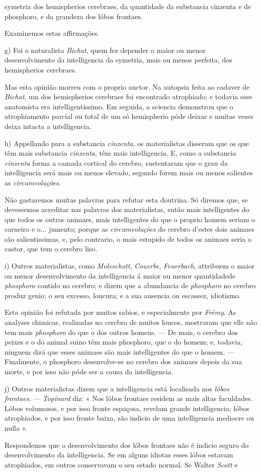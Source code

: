 symetria dos hemispherios cerebraes, da quantidade da substancia cinzenta e de phosphoro, e da grandeza dos lóbos frontaes.\par Examinemos estas affirmações.\par g) Foi o naturalista \emph{Bichat}, quem fez depender o maior ou menor desenvolvimento da intelligencia da symetria, mais ou menos perfeita, dos hemispherios cerebraes.\par Mas esta opinião morreu com o proprio auctor. Na autopsia feita ao cadaver de \emph{Bichat}, um dos hemispherios cerebraes foi encontrado atrophiado; e todavia esse anatomista era intelligentissimo. Em seguida, a sciencia demonstrou que o atrophiamento parcial ou total de um só hemispherio póde deixar e muitas vezes deixa intacta a intelligencia.\par h) Appellando para a substancia \emph{cinzenta}, os materialistas disseram que os que têm mais substancia \emph{cinzenta}, têm mais intelligencia. E, como a substancia \emph{cinzenta} forma a camada cortical do cerebro, sustentaram que o grau da intelligencia será mais ou menos elevado, segundo forem mais ou menos salientes as \emph{circumvoluções}.\par Não gastaremos muitas palavras para refutar esta doutrina. Só diremos que, se devessemos acreditar nas palavras dos materialistas, então mais intelligentes do que todos os outros animaes, mais intelligentes do que o proprio homem seriam o carneiro e o... jumento; porque as \emph{circumvoluções} do cerebro d'estes dois animaes são salientissimas, e, pelo contrario, o mais estupido de todos os animaes seria o castor, que tem o cerebro liso.\par i) Outros materialistas, como \emph{Moleschott}, \emph{Couerbe}, \emph{Feuerbach}, attribuem o maior ou menor desenvolvimento da intelligencia á maior ou menor quantidadede \emph{phosphoro} contido no cerebro; e dizem que a abundancia de \emph{phosphoro} no cerebro produz genio; o seu excesso, loucura; e a sua ausencia ou escassez, idiotismo.\par Esta opinião foi refutada por muitos sabios, e especialmente por \emph{Frémy}. As analyses chimicas, realizadas no cerebro de muitos loucos, mostraram que elle não tem mais \emph{phosphoro} do que o dos outros homens. --- De mais, o cerebro dos peixes e o do animal suino têm mais phosphoro, que o do homem; e, todavia, ninguem dirá que esses animaes são mais intelligentes do que o homem. --- Finalmente, o phosphoro desenvolve-se no cerebro dos animaes depois da sua morte, e por isso não póde ser a causa da intelligencia.\par j) Outros materialistas dizem que a intelligencia está localisada nos \emph{lóbos frontaes}. --- \emph{Topinard} diz: « Nos lóbos frontaes residem as mais altas faculdades. Lóbos volumosos, e por isso fronte espaçosa, revelam grande intelligencia; lóbos atrophiados, e por isso fronte baixa, são indicio de uma intelligencia mediocre ou nulla ».\par Respondemos que o desenvolvimento dos lóbos frontaes não é indicio seguro do desenvolvimento da intelligencia. Se em alguns idiotas esses lóbos estavam atrophiados, em outros conservavam o seu estado normal. Se Walter \emph{Scott} e 